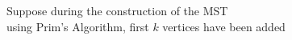 \documentclass[preview]{standalone}
\begin{document}
\begin{center}
Suppose during the construction of the MST\\ using Prim's Algorithm, first $k$ vertices have been added
\end{center}
\end{document}
